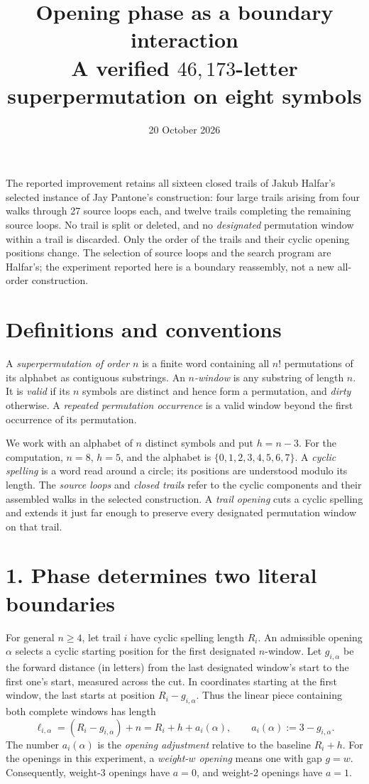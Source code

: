 \documentclass[11pt]{article}
\title{\vspace{-1.5em}Opening phase as a boundary interaction\\
\large A verified \(46{,}173\)-letter superpermutation on eight symbols}
\author{}
\date{20 October 2026}
\begin{document}
\maketitle
\vspace{-2.5em}

The reported improvement retains all sixteen closed trails of Jakub Halfar's
selected instance of Jay Pantone's construction: four large trails arising
from four walks through 27 source loops each, and twelve trails completing the
remaining source loops. No trail is split or deleted, and no \emph{designated}
permutation window within a trail is discarded. Only the order of the trails
and their cyclic opening positions change. The selection of source loops and
the search program are Halfar's; the experiment reported here is a boundary
reassembly, not a new all-order construction.

\section*{Definitions and conventions}
A \emph{superpermutation of order \(n\)} is a finite word containing all \(n!\)
permutations of its alphabet as contiguous substrings. An \emph{\(n\)-window}
is any substring of length \(n\). It is \emph{valid} if its \(n\) symbols are
distinct and hence form a permutation, and \emph{dirty} otherwise. A
\emph{repeated permutation occurrence} is a valid window beyond the first
occurrence of its permutation.

We work with an alphabet of \(n\) distinct symbols and put \(h=n-3\).
For the computation, \(n=8\), \(h=5\), and the alphabet is
\(\{0,1,2,3,4,5,6,7\}\). A \emph{cyclic spelling} is a word read around a
circle; its positions are understood modulo its length. The \emph{source
loops} and \emph{closed trails} refer to the cyclic components and their
assembled walks in the selected construction. A \emph{trail opening} cuts a
cyclic spelling and extends it just far enough to preserve every designated
permutation window on that trail.

\section*{1. Phase determines two literal boundaries}
For general \(n\geq4\), let trail \(i\) have cyclic spelling length \(R_i\).
An admissible opening \(\alpha\) selects a cyclic starting position for the
first designated \(n\)-window. Let \(g_{i,\alpha}\) be the forward distance
(in letters) from the last designated window's start to the first one's
start, measured across the cut. In coordinates starting at the first
window, the last starts at position \(R_i-g_{i,\alpha}\). Thus the linear
piece containing both complete windows has length
\[
\ell_{i,\alpha}
=(R_i-g_{i,\alpha})+n
=R_i+h+a_i(\alpha),
\qquad a_i(\alpha):=3-g_{i,\alpha}.
\]
The number \(a_i(\alpha)\) is the \emph{opening adjustment} relative to the
baseline \(R_i+h\). For the openings in this experiment, a
\emph{weight-\(w\) opening} means one with gap \(g=w\). Consequently,
weight-3 openings have \(a=0\), and weight-2 openings have \(a=1\).
\end{document}
